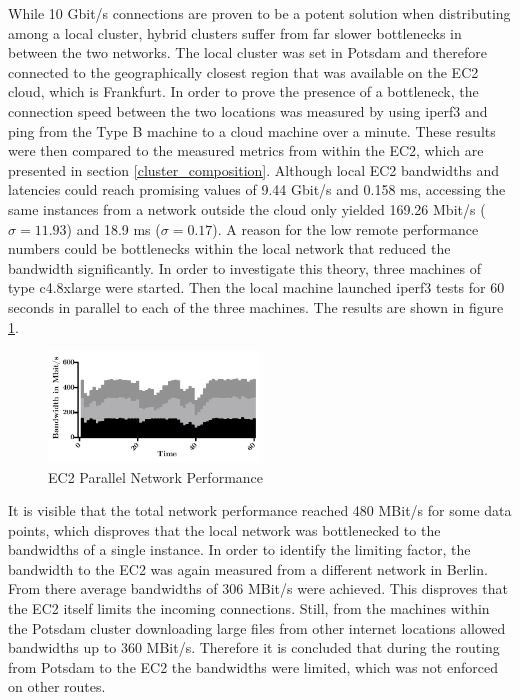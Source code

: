 While 10 Gbit/s connections are proven to be a potent solution when distributing among a local cluster, hybrid clusters suffer from far slower bottlenecks in between the two networks. The local cluster was set in Potsdam and therefore connected to the geographically closest region that was available on the EC2 cloud, which is Frankfurt. In order to prove the presence of a bottleneck, the connection speed between the two locations was measured by using iperf3 and ping from the Type B machine to a cloud machine over a minute. These results were then compared to the measured metrics from within the EC2, which are presented in section \ref{cluster_composition}. Although local EC2 bandwidths and latencies could reach promising values of 9.44 Gbit/s and 0.158 ms, accessing the same instances from a network outside the cloud only yielded 169.26 Mbit/s ($\sigma = 11.93$) and 18.9 ms ($\sigma = 0.17$). A reason for the low remote performance numbers could be bottlenecks within the local network that reduced the bandwidth significantly. In order to investigate this theory, three machines of type c4.8xlarge were started. Then the local machine launched iperf3 tests for 60 seconds in parallel to each of the three machines. The results are shown in figure \ref{img:EC2 Parallel Network Performance}.

\begin{figure}[!htb]
	\includegraphics[width=0.5\textwidth]{images/ec2_stacked_network_performance.pdf}
	\centering
	\caption{EC2 Parallel Network Performance}
	\label{img:EC2 Parallel Network Performance}
\end{figure}

It is visible that the total network performance reached 480 MBit/s for some data points, which disproves that the local network was bottlenecked to the bandwidths of a single instance. In order to identify the limiting factor, the bandwidth to the EC2 was again measured from a different network in Berlin. From there average bandwidths of 306 MBit/s were achieved. This disproves that the EC2 itself limits the incoming connections. Still, from the machines within the Potsdam cluster downloading large files from other internet locations allowed bandwidths up to 360 MBit/s. Therefore it is concluded that during the routing from Potsdam to the EC2 the bandwidths were limited, which was not enforced on other routes.

